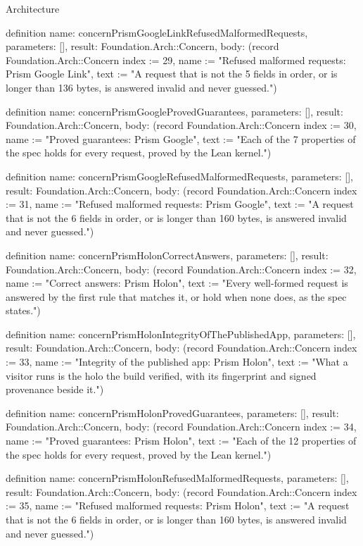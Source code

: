 \begin{lexlean}{Architecture}
\begin{semanticmodule}
definition{
  name: concernPrismGoogleLinkRefusedMalformedRequests,
  parameters: [],
  result: Foundation.Arch::Concern,
  body: (record Foundation.Arch::Concern {index := 29, name := "Refused malformed requests: Prism Google Link", text := "A request that is not the 5 fields in order, or is longer than 136 bytes, is answered invalid and never guessed."})
}

definition{
  name: concernPrismGoogleProvedGuarantees,
  parameters: [],
  result: Foundation.Arch::Concern,
  body: (record Foundation.Arch::Concern {index := 30, name := "Proved guarantees: Prism Google", text := "Each of the 7 properties of the spec holds for every request, proved by the Lean kernel."})
}

definition{
  name: concernPrismGoogleRefusedMalformedRequests,
  parameters: [],
  result: Foundation.Arch::Concern,
  body: (record Foundation.Arch::Concern {index := 31, name := "Refused malformed requests: Prism Google", text := "A request that is not the 6 fields in order, or is longer than 160 bytes, is answered invalid and never guessed."})
}

definition{
  name: concernPrismHolonCorrectAnswers,
  parameters: [],
  result: Foundation.Arch::Concern,
  body: (record Foundation.Arch::Concern {index := 32, name := "Correct answers: Prism Holon", text := "Every well-formed request is answered by the first rule that matches it, or hold when none does, as the spec states."})
}

definition{
  name: concernPrismHolonIntegrityOfThePublishedApp,
  parameters: [],
  result: Foundation.Arch::Concern,
  body: (record Foundation.Arch::Concern {index := 33, name := "Integrity of the published app: Prism Holon", text := "What a visitor runs is the holo the build verified, with its fingerprint and signed provenance beside it."})
}

definition{
  name: concernPrismHolonProvedGuarantees,
  parameters: [],
  result: Foundation.Arch::Concern,
  body: (record Foundation.Arch::Concern {index := 34, name := "Proved guarantees: Prism Holon", text := "Each of the 12 properties of the spec holds for every request, proved by the Lean kernel."})
}

definition{
  name: concernPrismHolonRefusedMalformedRequests,
  parameters: [],
  result: Foundation.Arch::Concern,
  body: (record Foundation.Arch::Concern {index := 35, name := "Refused malformed requests: Prism Holon", text := "A request that is not the 6 fields in order, or is longer than 160 bytes, is answered invalid and never guessed."})
}


\end{semanticmodule}
\end{lexlean}
